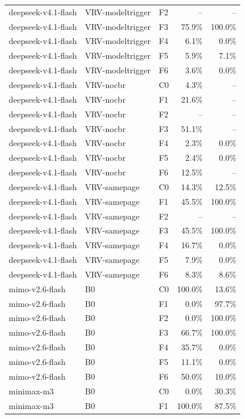 \begin{tabular}{lllrr}
deepseek-v4.1-flash & VRV-modeltrigger & F2 & -- & -- \\
deepseek-v4.1-flash & VRV-modeltrigger & F3 & 75.9\% & 100.0\% \\
deepseek-v4.1-flash & VRV-modeltrigger & F4 & 6.1\% & 0.0\% \\
deepseek-v4.1-flash & VRV-modeltrigger & F5 & 5.9\% & 7.1\% \\
deepseek-v4.1-flash & VRV-modeltrigger & F6 & 3.6\% & 0.0\% \\
deepseek-v4.1-flash & VRV-nocbr & C0 & 4.3\% & -- \\
deepseek-v4.1-flash & VRV-nocbr & F1 & 21.6\% & -- \\
deepseek-v4.1-flash & VRV-nocbr & F2 & -- & -- \\
deepseek-v4.1-flash & VRV-nocbr & F3 & 51.1\% & -- \\
deepseek-v4.1-flash & VRV-nocbr & F4 & 2.3\% & 0.0\% \\
deepseek-v4.1-flash & VRV-nocbr & F5 & 2.4\% & 0.0\% \\
deepseek-v4.1-flash & VRV-nocbr & F6 & 12.5\% & -- \\
deepseek-v4.1-flash & VRV-samepage & C0 & 14.3\% & 12.5\% \\
deepseek-v4.1-flash & VRV-samepage & F1 & 45.5\% & 100.0\% \\
deepseek-v4.1-flash & VRV-samepage & F2 & -- & -- \\
deepseek-v4.1-flash & VRV-samepage & F3 & 45.5\% & 100.0\% \\
deepseek-v4.1-flash & VRV-samepage & F4 & 16.7\% & 0.0\% \\
deepseek-v4.1-flash & VRV-samepage & F5 & 7.9\% & 0.0\% \\
deepseek-v4.1-flash & VRV-samepage & F6 & 8.3\% & 8.6\% \\
mimo-v2.6-flash & B0 & C0 & 100.0\% & 13.6\% \\
mimo-v2.6-flash & B0 & F1 & 0.0\% & 97.7\% \\
mimo-v2.6-flash & B0 & F2 & 0.0\% & 100.0\% \\
mimo-v2.6-flash & B0 & F3 & 66.7\% & 100.0\% \\
mimo-v2.6-flash & B0 & F4 & 35.7\% & 0.0\% \\
mimo-v2.6-flash & B0 & F5 & 11.1\% & 0.0\% \\
mimo-v2.6-flash & B0 & F6 & 50.0\% & 10.0\% \\
minimax-m3 & B0 & C0 & 0.0\% & 30.3\% \\
minimax-m3 & B0 & F1 & 100.0\% & 87.5\% \\

\end{tabular}
